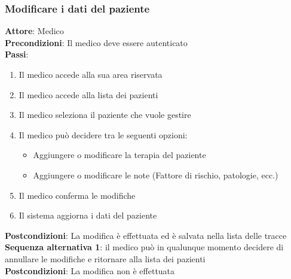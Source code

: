 \documentclass[a4paper]{article}
\begin{document}
\subsubsection{Modificare i dati del paziente}
\begin{mdframed}
  \textbf{Attore}: Medico\\
  \textbf{Precondizioni}: Il medico deve essere autenticato\\
  \textbf{Passi}: 
  \begin{enumerate}[nosep]
    \item Il medico accede alla sua area riservata
    \item Il medico accede alla lista dei pazienti
    \item Il medico seleziona il paziente che vuole gestire
    \item Il medico può decidere tra le seguenti opzioni:
      \begin{itemize}
        \item Aggiungere o modificare la terapia del paziente
        \item Aggiungere o modificare le note (Fattore di rischio, patologie, ecc.)
      \end{itemize}
    \item Il medico conferma le modifiche
    \item Il sistema aggiorna i dati del paziente
  \end{enumerate}
  \textbf{Postcondizioni}: La modifica è effettuata ed è salvata nella lista delle tracce\\
  \textbf{Sequenza alternativa 1}: il medico può in qualunque momento decidere di annullare le modifiche
  e ritornare alla lista dei pazienti\\
  \textbf{Postcondizioni}: La modifica non è effettuata
\end{mdframed}
\noindent
\end{document}
